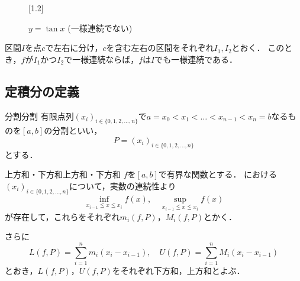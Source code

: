 
\begin{figure}[ht]
    \centering
\scalebox{1.2}[1.2]{
}
\caption{$y=\tan x$ (一様連続でない)}
\end{figure}

\begin{prop}{}{}
    区間$I$を点$c$で左右に分け，$c$を含む左右の区間をそれぞれ$I_1,I_2$とおく．
    このとき，$f$が$I_1$かつ$I_2$で一様連続ならば，$f$は$I$でも一様連続である．
\end{prop}
\newpage

\subsection{定積分の定義}

\begin{definition}{分割}{分割}
    有限点列$(x_i)_{i \in \{0, 1,2,\ldots,n\}}$で$a=x_0<x_1<\dots<x_{n-1}<x_n = b$なるものを$[a,b]$の分割といい，
    \[
        P=(x_i)_{i \in \{0,1,2,\ldots,n\}}
    \]
    とする．
\end{definition}

\begin{definition}{上方和・下方和}{上方和・下方和}
    $f$を$[a,b]$で有界な関数とする．
    における$(x_i)_{i \in \{ 0, 1,2,\ldots,n \} }$について，実数の連続性より
    \[
        \inf_{x_{i-1} \leqq x \leqq x_i} f(x),\quad \sup_{x_{i-1} \leqq x \leqq x_i} f(x)
    \]
    が存在して，これらをそれぞれ$m_i(f,P)$，$M_i(f,P)$とかく．

    さらに
    \[
       L(f,P) = \sum_{i=1}^{n} m_i (x_i-x_{i-1}) , \quad U(f,P) = \sum_{i=1}^{n} M_i (x_i - x_{i-1})
    \]
    とおき，$L(f,P)$，$U(f,P)$をそれぞれ下方和，上方和とよぶ．
\end{definition}

